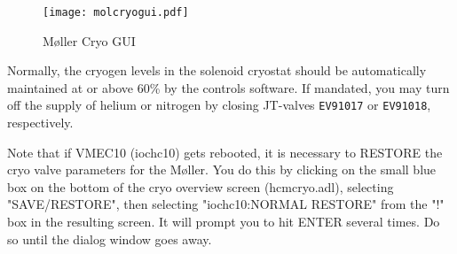 \begin{figure}
\begin{center}
\texttt{[image: molcryogui.pdf]}
\caption{M\o ller Cryo GUI\label{molcryomedm}}
\end{center}
\end{figure}
%

Normally, the cryogen levels in the solenoid cryostat should be
automatically maintained at or above 60\% by the controls software.
If mandated, you may turn off the supply of helium or nitrogen by
closing JT-valves {\tt EV91017} or {\tt EV91018}, respectively.

Note that if VMEC10 (iochc10) gets rebooted, it is necessary to RESTORE the cryo valve
parameters for the M\o ller. You do this by clicking on the small blue box on the
bottom of the cryo overview screen (hcmcryo.adl), selecting "SAVE/RESTORE",
then selecting "iochc10:NORMAL RESTORE" from the "!" box in the resulting
screen. It will prompt you to hit ENTER several times. Do so until the dialog
window goes away.

